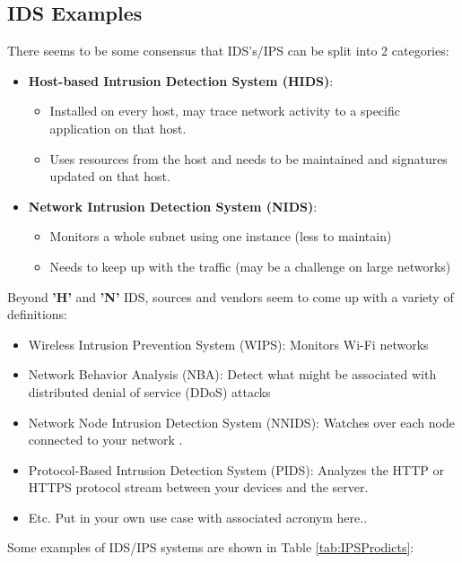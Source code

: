 \documentclass[
	letterpaper, %
	10pt, %
	unnumberedsections, %
	twoside, %
]{APAAssignment}
\begin{document}
\subsection{IDS Examples}


There seems to be  some consensus that IDS's/IPS can be split into 2 categories:

\begin{itemize}
	\item \textbf{Host-based Intrusion Detection System (HIDS)}: 
	\begin{itemize}
		\item Installed on every host, may trace network activity to a specific application on that host.
		\item Uses resources from the host and needs to be maintained and signatures updated on that host.
	\end{itemize}
	\item \textbf{Network Intrusion Detection System (NIDS)}: 
	\begin{itemize}
		\item Monitors a whole subnet using one instance (less to maintain) 
		\item Needs to keep up with the traffic (may be a challenge on large networks)
	\end{itemize}
\end{itemize}

Beyond \textbf{'H'} and \textbf{'N'} IDS, sources and vendors seem to come up with a variety of definitions:

\begin{itemize}
	\item Wireless Intrusion Prevention System (WIPS):   Monitors Wi-Fi networks \cite{FortinetIPSdefinitiopns}
	\item Network Behavior Analysis (NBA): Detect what might be associated with distributed denial of service (DDoS) attacks \cite{FortinetIPSdefinitiopns}
	\item Network Node Intrusion Detection System (NNIDS): Watches over each node connected to your network \cite{HelixstormIDSdefinitiopns}.
	\item Protocol-Based Intrusion Detection System (PIDS): Analyzes the HTTP or HTTPS protocol stream between your devices and the server\cite{HelixstormIDSdefinitiopns}.
	\item Etc. Put in your own use case with associated acronym here..
\end{itemize}

Some examples of IDS/IPS systems are shown in Table \ref{tab:IPSProdicts}:
\end{document}
